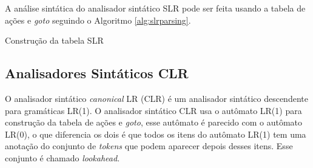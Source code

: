 A análise sintática do analisador sintático SLR pode ser feita usando a tabela de ações e \textit{goto} seguindo o Algoritmo \ref{alg:slrparsing}.
\begin{algorithm}[htp]
    \caption{Construção da tabela SLR}\label{alg:slrtable}
\end{algorithm}
{}


\subsection{Analisadores Sintáticos CLR}
O analisador sintático \textit{canonical} LR (CLR) é um analisador sintático descendente para gramáticas LR(1). O analisador sintático CLR usa o autômato LR(1) para construção da tabela de ações e \textit{goto}, esse autômato é parecido com o autômato LR(0), o que diferencia os dois é que todos os itens do autômato LR(1) tem uma anotação do conjunto de \textit{tokens} que podem aparecer depois desses itens. Esse conjunto é chamado \textit{lookahead}.

